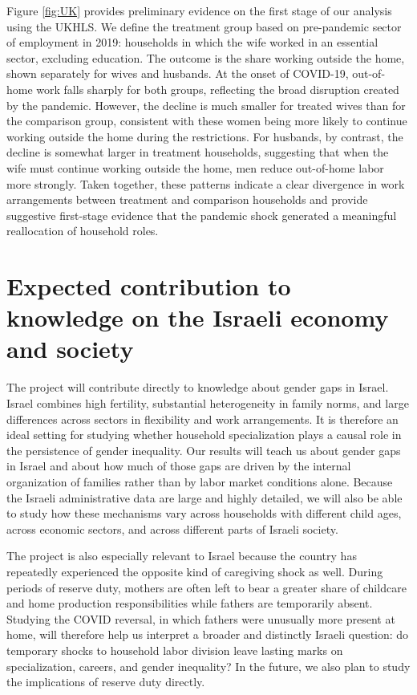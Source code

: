 \documentclass[12pt]{article}
\begin{document}
Figure \ref{fig:UK} provides preliminary evidence on the first stage of our analysis using the UKHLS. We define the treatment group based on pre-pandemic sector of employment in 2019: households in which the wife worked in an essential sector, excluding education. The outcome is the share working outside the home, shown separately for wives and husbands. At the onset of COVID-19, out-of-home work falls sharply for both groups, reflecting the broad disruption created by the pandemic. However, the decline is much smaller for treated wives than for the comparison group, consistent with these women being more likely to continue working outside the home during the restrictions. For husbands, by contrast, the decline is somewhat larger in treatment households, suggesting that when the wife must continue working outside the home, men reduce out-of-home labor more strongly. Taken together, these patterns indicate a clear divergence in work arrangements between treatment and comparison households and provide suggestive first-stage evidence that the pandemic shock generated a meaningful reallocation of household roles.

\section{Expected contribution to knowledge on the Israeli economy and society}

The project will contribute directly to knowledge about gender gaps in Israel. Israel combines high fertility, substantial heterogeneity in family norms, and large differences across sectors in flexibility and work arrangements. It is therefore an ideal setting for studying whether household specialization plays a causal role in the persistence of gender inequality. Our results will teach us about gender gaps in Israel and about how much of those gaps are driven by the internal organization of families rather than by labor market conditions alone. Because the Israeli administrative data are large and highly detailed, we will also be able to study how these mechanisms vary across households with different child ages, across economic sectors, and across different parts of Israeli society.

The project is also especially relevant to Israel because the country has repeatedly experienced the opposite kind of caregiving shock as well. During periods of reserve duty, mothers are often left to bear a greater share of childcare and home production responsibilities while fathers are temporarily absent. Studying the COVID reversal, in which fathers were unusually more present at home, will therefore help us interpret a broader and distinctly Israeli question: do temporary shocks to household labor division leave lasting marks on specialization, careers, and gender inequality? In the future, we also plan to study the implications of reserve duty directly.
\end{document}
